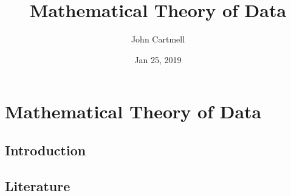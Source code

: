 

\usepackage{mathptmx}
\usepackage{amsfonts}
\usepackage{wasysym}
\usepackage{url}
\usepackage{hyperref}

\newcommand{\sharedmacros}{../../SharedMacros}








\renewcommand{\erpictureFolder}[0]{../../SharedPictures}
\setcounter{equation}{0}



\title[John Cartmell]{Mathematical Theory of Data}
\author{John Cartmell}
\date{Jan 25, 2019}

\usepackage{bibentry}
\nobibliography*



\begin{frame}
\titlepage
\end{frame}

\iffalse
\begin{frame}{Test}
\begin{description}	[longest label] 
\item<1->[short] Some text. 
\item<2->[longest label] Some text. 
\item<3->[long label] Some text. 
\end{description}
\end{frame}
\fi

\section{Mathematical Theory of Data}

\subsection{Introduction}


\subsection{Literature}


